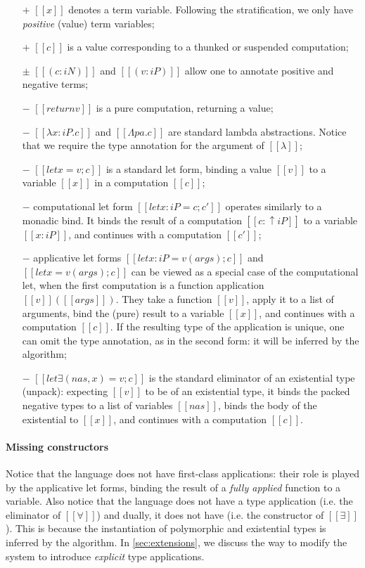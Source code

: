 \begin{itemize}
    \item [$+$] $[[x]]$ denotes a term variable.
      Following the \CBPV stratification, we only have \emph{positive} (value)
      term variables;
    \item [$+$] $[[{c}]]$ is a value corresponding to a thunked 
        or suspended computation;
    \item [$\pm$] $[[(c : iN)]]$ and $[[(v : iP)]]$ allow one to annotate 
        positive and negative terms;
    \item [$-$] $[[return v]]$ is a pure computation, returning a value;
    \item [$-$] $[[λ x : iP . c]]$ and $[[Λ pa . c]]$
        are standard lambda abstractions. Notice that we require
        the type annotation for the argument of $[[λ]]$;
    \item [$-$] $[[ let x = v ; c]]$ is a standard let form, binding
        a value $[[v]]$ to a variable $[[x]]$ in a computation $[[c]]$;
    \item [$-$] computational let form $[[ let x : iP = c; c']]$ 
      operates similarly to a monadic bind.
      It binds the result of a computation $[[c : ↑iP]]$ 
      to a variable $[[x : iP]]$, and continues with a computation $[[c']]$;
    \item [$-$] applicative let forms $[[let x : iP = v ( args ) ; c]]$ and
        $[[let x = v ( args ) ; c]]$ can be viewed as a special case of the
        computational let, when the first computation is a function application
        $[[v]] ([[args]])$.
        They take a function $[[v]]$, apply it to a list of
        arguments, bind the (pure) result to a variable
        $[[x]]$, and continues with a computation $[[c]]$. If the resulting type
        of the application is unique, one can omit the type annotation, as in
        the second form: it will be inferred by the algorithm;
    \item [$-$] $[[let∃ ( nas , x ) = v ; c]]$
        is the standard eliminator of an existential type (unpack):
        expecting $[[v]]$ to be of an existential type,
        it binds the packed negative types to a list of 
        variables $[[nas]]$, binds the body of the existential
        to $[[x]]$, and continues with a computation $[[c]]$.
\end{itemize}

\paragraph*{Missing constructors}
Notice that the language does not have first-class applications: 
their role is played by the applicative let forms, binding 
the result of a \emph{fully applied} function to a variable.
Also notice that the language does not have a type application (i.e. the eliminator of $[[∀]]$) and dually, it does not have \pack (i.e. the constructor of $[[∃]]$).
This is because the instantiation of polymorphic and existential types is inferred by the algorithm. 
In \cref{sec:extensions}, we discuss the way to modify the system to introduce \emph{explicit} type applications.



